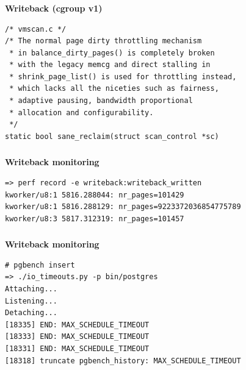 \documentclass[usenames,dvipsnames, 18pt, compress, aspectratio=169]{beamer}
\begin{document}
\begin{frame}[fragile]{}
    \frametitle{}
    \begin{center}
        \textbf{Writeback (cgroup v1)}

        \begin{flushleft}
        \begin{verbatim}
/* vmscan.c */
/* The normal page dirty throttling mechanism
 * in balance_dirty_pages() is completely broken
 * with the legacy memcg and direct stalling in
 * shrink_page_list() is used for throttling instead,
 * which lacks all the niceties such as fairness,
 * adaptive pausing, bandwidth proportional
 * allocation and configurability.
 */
static bool sane_reclaim(struct scan_control *sc)
        \end{verbatim}
        \end{flushleft}

    \end{center}
\end{frame}

\begin{frame}[fragile]{}
    \frametitle{}
    \begin{center}
        \textbf{Writeback monitoring}

        \begin{flushleft}
        \begin{verbatim}
=> perf record -e writeback:writeback_written
kworker/u8:1 5816.288044: nr_pages=101429
kworker/u8:1 5816.288129: nr_pages=9223372036854775789
kworker/u8:3 5817.312319: nr_pages=101457
        \end{verbatim}
        \end{flushleft}

    \end{center}
\end{frame}

\begin{frame}[fragile]{}
    \frametitle{}
    \begin{center}
        \textbf{Writeback monitoring}

        \begin{flushleft}
        \begin{verbatim}
# pgbench insert
=> ./io_timeouts.py -p bin/postgres
Attaching...
Listening...
Detaching...
[18335] END: MAX_SCHEDULE_TIMEOUT
[18333] END: MAX_SCHEDULE_TIMEOUT
[18331] END: MAX_SCHEDULE_TIMEOUT
[18318] truncate pgbench_history: MAX_SCHEDULE_TIMEOUT
        \end{verbatim}
        \end{flushleft}

    \end{center}
\end{frame}
\end{document}
